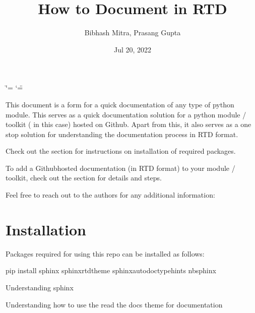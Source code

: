 \documentclass[letterpaper,10pt,english]{sphinxmanual}
\title{How to Document in RTD}
\date{Jul 20, 2022}
\author{Bibhash Mitra, Prasang Gupta}
\begin{document}
\ifdefined\shorthandoff
  \ifnum\catcode`\=\string=\active\shorthandoff{=}\fi
  \ifnum\catcode`\"=\active{}\fi
\fi

\pagestyle{empty}
\sphinxmaketitle
\pagestyle{plain}
\sphinxtableofcontents
\pagestyle{normal}
\label{\detokenize{index::doc}}


\sphinxAtStartPar
This document is a  form for a quick documentation of any type of python module.
This serves as a quick documentation solution for a python module / toolkit ( in this case) hosted on Github.
Apart from this, it also serves as a one stop solution for understanding the documentation process in RTD format.

\sphinxAtStartPar
Check out the {\hyperref[\detokenize{installation::doc}]{}} section for instructions on installation of required packages.

\sphinxAtStartPar
To add a Github\sphinxhyphen{}hosted documentation (in RTD format) to your module / toolkit, check out the {\hyperref[\detokenize{usage::doc}]{}} section for details and steps.

\sphinxAtStartPar
Feel free to reach out to the authors for any additional information:

\sphinxAtStartPar
{}

\sphinxstepscope


\chapter{Installation}
\label{\detokenize{installation:installation}}\label{\detokenize{installation::doc}}
\sphinxAtStartPar
Packages required for using this repo can be installed as follows:

\begin{sphinxVerbatim}[commandchars=\\\{\}]
pip install sphinx sphinx\PYGZus{}rtd\PYGZus{}theme sphinx\PYGZhy{}autodoc\PYGZhy{}typehints nbsphinx
\end{sphinxVerbatim}


\nopagebreak

\begin{description}
\sphinxAtStartPar
Understanding sphinx

\sphinxAtStartPar
Understanding how to use the read the docs theme for documentation

\end{description}
\end{document}
